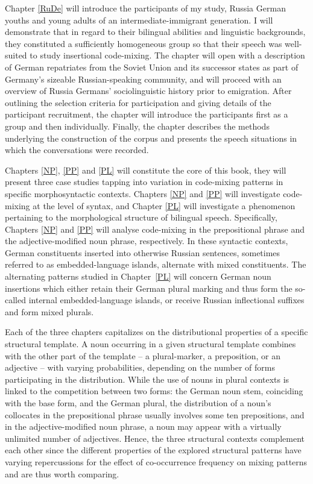 \begin{sloppypar}
Chapter \ref{RuDe} will introduce the participants of my study, Russia German youths and young adults of an intermediate-immigrant generation. I will demonstrate that in regard to their bilingual abilities and linguistic backgrounds, they constituted a sufficiently homogeneous group so that their speech was well-suited to study insertional code-mixing. The chapter will open with a description of German repatriates from the Soviet Union and its successor states as part of Germany's sizeable Russian-speaking community, and will proceed with an overview of Russia Germans' sociolinguistic history prior to emigration. After outlining the selection criteria for participation and giving details of the participant recruitment, the chapter will introduce the participants first as a group and then individually. Finally, the chapter describes the methods underlying the construction of the corpus and presents the speech situations in which the  conversations were recorded.
\end{sloppypar}

Chapters \ref{NP}, \ref{PP} and \ref{PL} will constitute the core of this book, they will present three case studies tapping into variation in code-mixing patterns in specific morphosyntactic contexts. Chapters \ref{NP} and \ref{PP} will investigate code-mixing at the level of syntax, and Chapter \ref{PL} will investigate a phenomenon pertaining to the morphological structure of bilingual speech. Specifically, Chapters \ref{NP} and \ref{PP} will analyse code-mixing in the prepositional phrase and the adjective-modified noun phrase, respectively. In these syntactic contexts, German constituents inserted into otherwise Russian sentences, sometimes referred to as  embedded-language islands, alternate with mixed constituents. The alternating patterns studied in Chapter~\ref{PL} will concern German noun insertions which either retain their German plural marking and thus form the so-called internal embedded-language islands, or receive Russian inflectional suffixes and form mixed plurals. 

Each of the three chapters capitalizes on the  distributional properties of a specific structural template. A noun occurring in a given structural template combines with the other part of the template -- a plural-marker, a preposition, or an  adjective -- with varying probabilities, depending on the number of forms participating in the distribution. While the use of nouns in plural contexts is linked to the competition between two forms: the German noun stem,  coinciding with the base form, and the German plural, the distribution of a noun's collocates in the prepositional phrase usually involves some ten prepositions, and in the adjective-modified noun phrase, a noun may appear with a virtually unlimited number of adjectives. Hence,  the three structural contexts complement each other since the different properties of the explored structural patterns have varying repercussions for the effect of co-occurrence frequency on mixing patterns and are thus worth comparing.

